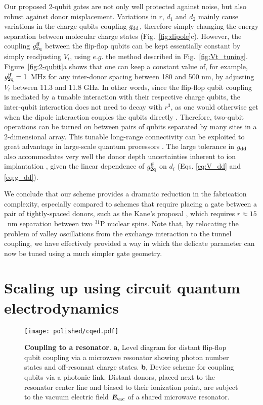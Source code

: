 Our proposed 2-qubit gates are not only well protected against noise, but also robust against donor misplacement. Variations in $r$, $d_1$ and $d_2$ mainly cause variations in the charge qubits coupling $g_{\rm dd}$, therefore simply changing the energy separation between molecular charge states (Fig.~\ref{fig:dipole}c). However, the coupling $g_{\rm 2q}^{\rm ff}$ between the flip-flop qubits can be kept essentially constant by simply readjusting $V_t$, using $e.g.$ the method described in Fig.~\ref{fig:Vt_tuning}. Figure~\ref{fig:2-qubit}a shows that one can keep a constant value of, for example, $g_{\rm 2q}^{\rm ff} = 1$~MHz for any inter-donor spacing between 180 and 500 nm, by adjusting $V_t$ between 11.3 and 11.8 GHz. In other words, since the flip-flop qubit coupling is mediated by a tunable interaction with their respective charge qubits, the inter-qubit interaction does not need to decay with $r^3$, as one would otherwise get when the dipole interaction couples the qubits directly \cite{OGorman2016,Hill2015}. Therefore, two-qubit operations can be turned on between pairs of qubits separated by many sites in a 2-dimensional array. This tunable long-range connectivity can be exploited to great advantage in large-scale quantum processors \cite{Li2018}. The large tolerance in $g_{\rm dd}$ also accommodates very well the donor depth uncertainties inherent to ion implantation \cite{VanDonkelaar2015}, given the linear dependence of $g_{\rm 2q}^{\rm ff}$ on $d_i$ (Eqs. \ref{eq:V_dd} and \ref{eq:g_dd}).  

We conclude that our scheme provides a dramatic reduction in the fabrication complexity, especially compared to schemes that require placing a gate between a pair of tightly-spaced donors, such as the Kane's proposal \cite{Kane1998}, which requires $r\approx15$~nm separation between two $^{31}$P nuclear spins. Note that, by relocating the problem of valley oscillations from the exchange interaction \cite{Kane1998} to the tunnel coupling, we have effectively provided a way in which the delicate parameter can now be tuned using a much simpler gate geometry.


\section{Scaling up using circuit quantum electrodynamics} \label{sec:cqed_ff}

\begin{figure}
	\centering
	\texttt{[image: polished/cqed.pdf]}
	\caption[Coupling to a resonator]{\textbf{Coupling to a resonator}.
		\textbf{a}, Level diagram for distant flip-flop qubit coupling via a microwave resonator showing photon number states and off-resonant charge states. 
		\textbf{b}, Device scheme for coupling qubits via a photonic link. Distant donors, placed next to the resonator center line and biased to their ionization point, are subject to the vacuum electric field $\textit{\textbf{E}}_{\rm vac}$ of a shared microwave resonator.}
	\label{fig:cqed}
\end{figure}

